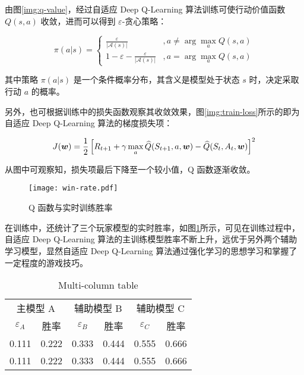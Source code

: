 由图\ref{img:q-value}，经过自适应 Deep Q-Learning 算法训练可使行动价值函数 $Q(s,a)$ 收敛，进而可以得到 $\varepsilon$-贪心策略：

\begin{equation}
    \pi(a|s)=
    \begin{cases}
        \frac{\varepsilon}{|\mathcal A(s)|}&, a\neq\arg\max_aQ(s,a)\\
        1-\varepsilon-\frac{\varepsilon}{|\mathcal A(s)|}&, a=\arg\max_aQ(s,a)
    \end{cases}
\end{equation}

其中策略 $\pi(a|s)$ 是一个条件概率分布，其含义是模型处于状态 $s$ 时，决定采取行动 $a$ 的概率。

另外，也可根据训练中的损失函数观察其收敛效果，图\ref{img:train-loss}所示的即为 自适应 Deep Q-Learning 算法的梯度损失项：

\begin{equation}
    \centering
    J(\boldsymbol{w}) = \frac{1}{2}\left[R_{t+1}+\gamma\max_a\widehat{Q}(S_{t+1},a,\boldsymbol{w})-\widehat{Q}(S_t,A_t,\boldsymbol{w})\right]^2
\end{equation}

从图中可观察知，损失项最后下降至一个较小值，Q 函数逐渐收敛。

\begin{figure}[H]
    \centering
    \texttt{[image: win-rate.pdf]}
    \caption{Q 函数与实时训练胜率}\label{img:win-rate}
\end{figure}

在训练中，还统计了三个玩家模型的实时胜率，如图\ref{img:win-rate}所示，可见在训练过程中，自适应 Deep Q-Learning 算法的主训练模型胜率不断上升，远优于另外两个辅助学习模型，显然自适应 Deep Q-Learning 算法通过强化学习的思想学习和掌握了一定程度的游戏技巧。

\begin{table}[H]
\caption{Multi-column table}
\begin{center}
\begin{tabular}{c|c|c|c|c|c}
    \toprule[2pt]
    \multicolumn{2}{c|}{主模型 A}&\multicolumn{2}{c}{辅助模型 B}&\multicolumn{2}{c}{辅助模型 C}\\
    $\varepsilon_A$&胜率&$\varepsilon_B$&胜率&$\varepsilon_C$&胜率\\
    \midrule[2pt]
    0.111&0.222&0.333&0.444&0.555&0.666\\
    0.111&0.222&0.333&0.444&0.555&0.666\\
    \bottomrule[2pt]
\end{tabular}
\end{center}
\label{tab:multicol}
\end{table}